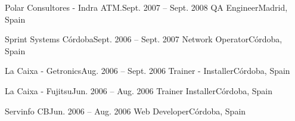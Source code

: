     \resumeSubheading
    {Polar Consultores - Indra ATM.}{Sept. 2007 -- Sept. 2008}
    {QA Engineer}{Madrid, Spain}
    \resumeItemListStart
    \resumeItemListEnd

    \resumeSubheading
    {Sprint Systems Córdoba}{Sept. 2006 -- Sept. 2007}
    {Network Operator}{Córdoba, Spain}
    \resumeItemListStart
    \resumeItemListEnd

    \resumeSubheading
    {La Caixa - Getronics}{Aug. 2006 -- Sept. 2006}
    {Trainer - Installer}{Córdoba, Spain}
    \resumeItemListStart
    \resumeItemListEnd

    \resumeSubheading
    {La Caixa - Fujitsu}{Jun. 2006 -- Aug. 2006}
    {Trainer Installer}{Córdoba, Spain}
    \resumeItemListStart
    \resumeItemListEnd

    \resumeSubheading
    {Servinfo CB}{Jun. 2006 -- Aug. 2006}
    {Web Developer}{Córdoba, Spain}
    \resumeItemListStart
    \resumeItemListEnd
\resumeSubHeadingListEnd